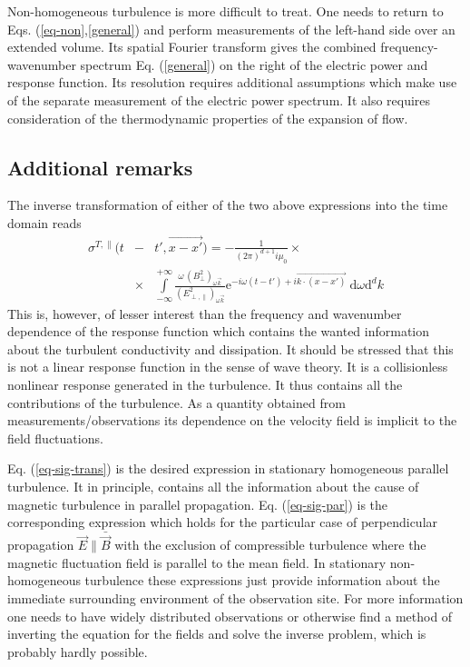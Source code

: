 \documentclass[ ]{copernicus2}
\begin{document}
{Non-homogeneous turbulence is more difficult to treat. One needs to return to Eqs. (\ref{eq-non},\ref{general}) and perform measurements of the left-hand side over an extended volume. Its spatial Fourier transform gives the combined frequency-wavenumber spectrum Eq. (\ref{general}) on the right of the electric power and response function. Its resolution requires additional assumptions which make use of the separate measurement of the electric power spectrum. It also requires consideration of the thermodynamic properties of the expansion of flow.

\subsection{{Additional remarks}}
The inverse transformation of either of the two above expressions into the time domain reads
\begin{eqnarray*}
\sigma^{T,\|}(t&-&t',\vec{x-x'})= -\frac{1}{(2\pi)^{d+1} i\mu_0}\times \\
&\times&\int\limits_{-\infty}^{+\infty}\frac{\omega\,(B^2_\perp)_{\omega\vec{k}}}{(E^2_{\perp,\|})_{\omega\vec{k}}}\mathrm{e}^{-i\omega (t-t')+i\vec{k\cdot(x-x')}}~{\mathrm{d}\omega}\mathrm{d}^dk
\end{eqnarray*}
This is, however, of lesser interest than the frequency and wavenumber dependence of the response function which contains the wanted information about the turbulent conductivity and dissipation. It should be stressed that this is not a linear response function in the sense of wave theory. It is a collisionless nonlinear response generated in the turbulence. It thus contains all the contributions of the turbulence. As a quantity obtained from measurements/observations its dependence on the velocity field is implicit to the field fluctuations.


{Eq. (\ref{eq-sig-trans}) is the desired expression in stationary homogeneous parallel turbulence. It in principle, contains all the information about the cause of magnetic turbulence in parallel propagation. Eq. (\ref{eq-sig-par}) is the corresponding expression which holds for the particular case of perpendicular propagation $\vec{E}\|\bar{\vec{B}}$ with the exclusion of  compressible turbulence where the magnetic fluctuation field is parallel to the mean field.} In stationary non-homogeneous turbulence these expressions just provide information about the immediate surrounding environment of the observation site. For more information one needs to have widely distributed observations or otherwise find a method of inverting the equation for the fields and solve the inverse problem, which is probably hardly possible.

}
\end{document}
